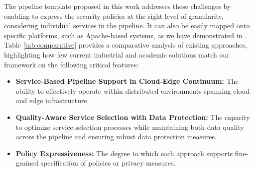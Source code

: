 The pipeline template proposed in this work addresses these challenges by enabling to express the security policies at the right level of granularity, considering individual services in the pipeline. It can also be easily mapped onto specific platforms, such as Apache-based systems, as we have demonstrated in \cite{medes2021}.
Table \ref{tab:comparative} provides a comparative analysis of existing approaches, highlighting how few current industrial and academic solutions match our framework on the following critical features:
\begin{itemize}
    \item \textbf{Service-Based Pipeline Support in Cloud-Edge Continuum:} The ability to effectively operate within distributed environments spanning cloud and edge infrastructure.
    \item \textbf{Quality-Aware Service Selection with Data Protection:} The capacity to optimize service selection processes while maintaining both data quality across the pipeline and ensuring robust data protection measures.

    \item \textbf{Policy Expressiveness:} The degree to which each approach supports fine-grained specification of policies or privacy measures.
\end{itemize}

